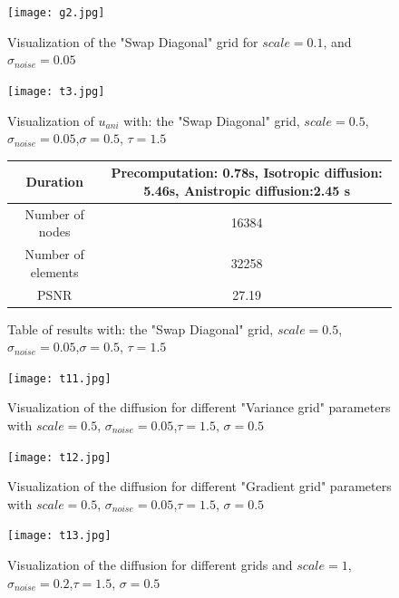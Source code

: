 \documentclass{report}
\begin{document}
\begin{figure}
	\label{g2}
	\centering
	\caption{Visualization of the "Swap Diagonal" grid for $scale=0.1$, and $\sigma_{noise}=0.05$}
	\texttt{[image: g2.jpg]}
\end{figure}


\begin{figure}
	\label{t3}
	\centering
	\caption{Visualization of $u_{ani}$ with: the "Swap Diagonal" grid, $scale=0.5$, $\sigma_{noise}=0.05$,$\sigma=0.5$, $\tau=1.5$}
	\texttt{[image: t3.jpg]}
\end{figure}





\begin{figure}[h!]
	\centering
	\caption{Table of results with: the "Swap Diagonal" grid, $scale=0.5$, $\sigma_{noise}=0.05$,$\sigma=0.5$, $\tau=1.5$}
	\label{T3}
	\begin{tabular}{|c|c|}
		\hline
		Duration &  Precomputation: 0.78s,
		Isotropic diffusion: 5.46s,
		Anistropic diffusion:2.45 s   \\
		\hline
		Number of nodes & 16384 \\
		\hline
		Number of elements & 32258\\
		
		\hline
		PSNR & 27.19 \\
		\hline
	\end{tabular}
\end{figure}



\begin{figure}
	\centering
	\label{t11}
	\caption{Visualization of the diffusion for different "Variance grid" parameters with $scale=0.5$, $\sigma_{noise}=0.05$,$\tau=1.5$, $\sigma=0.5$ }
	\texttt{[image: t11.jpg]}
\end{figure}

\begin{figure}
	\centering
	\label{t12}
	\caption{Visualization of the diffusion for different "Gradient grid" parameters with $scale=0.5$, $\sigma_{noise}=0.05$,$\tau=1.5$, $\sigma=0.5$ }
	\texttt{[image: t12.jpg]}
\end{figure}



\begin{figure}[h!]
	\label{t13}
	\centering
	\caption{Visualization of the diffusion for different grids and $scale=1$, $\sigma_{noise}=0.2$,$\tau=1.5$, $\sigma=0.5$ }
	\texttt{[image: t13.jpg]}
\end{figure}
\end{document}
